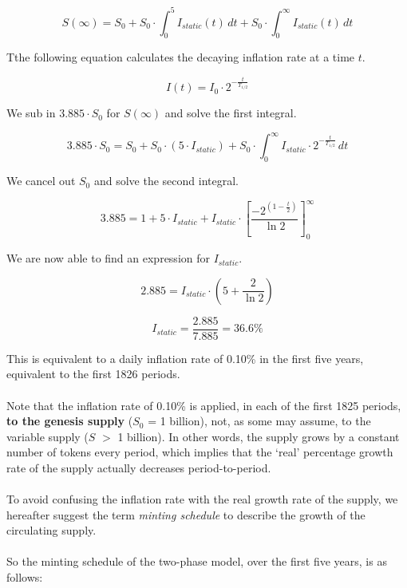 \documentclass[8pt]{article}
\begin{document}
\begin{equation}
    S(\infty) = S_0  +  S_0 \cdot \int_0^{5} I_{static}(t)\, dt  +  S_0 \cdot \int_0^{\infty} I_{static}(t)\, dt
\end{equation}

Tthe following equation calculates the decaying inflation rate at a time $t$.
 
 \begin{equation}
    I(t) = I_0 \cdot 2^{-\frac{t}{T_{1/2}}}
\end{equation}

We sub in $3.885 \cdot S_0$ for $S(\infty)$ and solve the first integral.

\begin{equation}
    3.885 \cdot S_0  = S_0 + S_0 \cdot (5 \cdot I_{static}) + S_0 \cdot \int_0^{\infty}     I_{static} \cdot 2^{-\frac{t}{T_{1/2}}} \, dt
\end{equation}

We cancel out $S_0$ and solve the second integral.

\begin{equation}
    3.885 = 1 + 5 \cdot  I_{static} + I_{static} \cdot \left[\frac{-2^{(1-\frac{t}{2})}}{\ln{2}}\right]_0^\infty
\end{equation}

We are now able to find an expression for $I_{static}$.

\begin{equation}
    2.885 = I_{static} \cdot (5 + \frac{2}{\ln{2}})
\end{equation}

\begin{equation}
   I_{static} = \frac{2.885}{7.885} = 36.6\%
\end{equation}

This is equivalent to a daily inflation rate of 0.10\% in the first five years, equivalent to the first 1826 periods.
\\\\
Note that the inflation rate of 0.10\% is applied, in each of the first 1825 periods, \textbf{to the genesis supply} ($S_0$ = 1 billion), not, as some may assume, to the variable supply ($S$ $>$ 1 billion). In other words, the supply grows by a constant number of tokens every period, which implies that the `real' percentage growth rate of the supply actually decreases period-to-period. 
\\\\
To avoid confusing the inflation rate with the real growth rate of the supply, we hereafter suggest the term \textit{minting schedule} to describe the growth of the circulating supply.
\\\\
So the minting schedule of the two-phase model, over the first five years, is as follows: 
\end{document}
